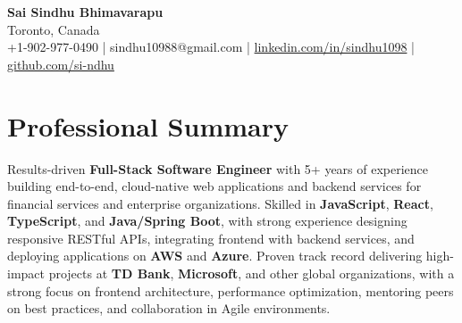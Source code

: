 \documentclass[letterpaper,11pt]{article}
\begin{document}
\begin{center}
  {\Large \textbf{Sai Sindhu Bhimavarapu}} \\
  Toronto, Canada \\
  +1-902-977-0490 \enspace | \enspace sindhu10988@gmail.com \enspace | \enspace \href{https://www.linkedin.com/in/sindhu1098/}{linkedin.com/in/sindhu1098} \enspace | \enspace \href{https://github.com/si-ndhu}{github.com/si-ndhu}
\end{center}

\section{Professional Summary}
  \begin{itemize}[leftmargin=0.15in, label={}]
    \small{\item{
     Results-driven \textbf{Full-Stack Software Engineer} with 5+ years of experience building end-to-end, cloud-native web applications and backend services for financial services and enterprise organizations. Skilled in \textbf{JavaScript}, \textbf{React}, \textbf{TypeScript}, and \textbf{Java/Spring Boot}, with strong experience designing responsive RESTful APIs, integrating frontend with backend services, and deploying applications on \textbf{AWS} and \textbf{Azure}. Proven track record delivering high-impact projects at \textbf{TD Bank}, \textbf{Microsoft}, and other global organizations, with a strong focus on frontend architecture, performance optimization, mentoring peers on best practices, and collaboration in Agile environments.
    }}
  \end{itemize}
\vspace{-16pt}

\end{document}
